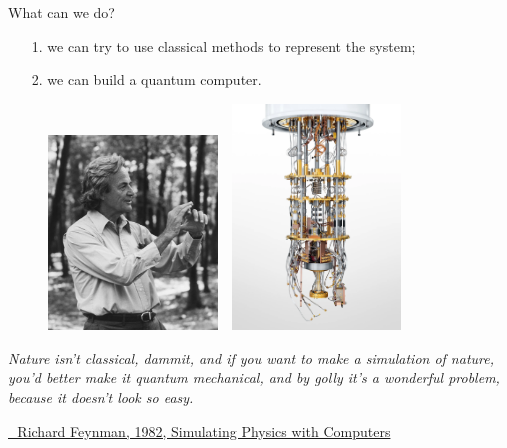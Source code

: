 \documentclass[8pt, xcolor={svgnames}, hyperref={linkcolor=black}]{beamer}
\begin{document}
\begin{frame}{What can we do?}
\pause
\begin{itemize}[noitemsep]
\item[1.] we can try to use classical methods to represent the system;
\pause
\item[2.] we can build a quantum computer.
\end{itemize}
\pause
\begin{figure}
   \includegraphics[width=0.4\textwidth, height=0.55\textheight]{figures/feynmann.jpg}%
   $\,\,$ \pause
   \includegraphics[width=0.4\textwidth, height=0.55\textheight]{figures/qcomp.png}
\end{figure}

\small
\textit{Nature isn't classical, dammit, and if you want to make a simulation of nature, 
you'd better make it quantum mechanical, and by golly it's a wonderful problem, 
because it doesn't look so easy.} 

\href{https://link.springer.com/article/10.1007/BF02650179}{\faBook\,\, Richard Feynman, 1982, Simulating Physics with Computers}
\end{frame}
\end{document}
